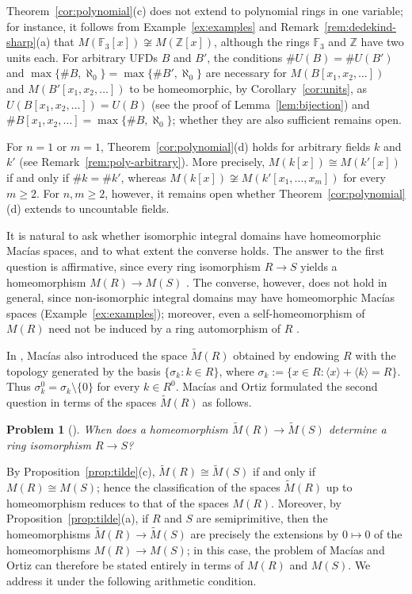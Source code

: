 \documentclass[12pt,reqno,a4paper]{amsart}
\newcommand{\Z}{\mathbb{Z}}
\newcommand{\F}{\mathbb{F}}
\theoremstyle{plain}
\newtheorem*{macproblem}{Problem}
\theoremstyle{definition}
\begin{document}
Theorem~\ref{cor:polynomial}(c) does not extend to polynomial rings in one variable; for instance, it follows from Example~\ref{ex:examples} and Remark~\ref{rem:dedekind-sharp}(a) that $M(\F_3[x])\not\cong M(\Z[x])$, although the rings $\F_3$ and $\Z$ have two units each. For arbitrary UFDs $B$ and $B'$, the conditions $\#U(B)=\#U(B')$ and $\max\{\#B,\aleph_0\}=\max\{\#B',\aleph_0\}$ are necessary for $M(B[x_1,x_2,\dots])$ and $M(B'[x_1,x_2,\dots])$ to be homeomorphic, by Corollary~\ref{cor:units}, as $U(B[x_1,x_2,\dots])=U(B)$ (see the proof of Lemma~\ref{lem:bijection}) and $\#B[x_1,x_2,\dots]=\max\{\#B,\aleph_0\}$; whether they are also sufficient remains open.

For $n=1$ or $m=1$, Theorem~\ref{cor:polynomial}(d) holds for arbitrary fields $k$ and $k'$ (see Remark~\ref{rem:poly-arbitrary}). More precisely, $M(k[x])\cong M(k'[x])$ if and only if $\#k=\#k'$, whereas $M(k[x])\not\cong M(k'[x_1,\dots,x_m])$ for every $m\geq2$. For $n,m\geq2$, however, it remains open whether Theorem~\ref{cor:polynomial}(d) extends to uncountable fields.

It is natural to ask whether isomorphic integral domains have homeomorphic Mac\'ias spaces, and to what extent the converse holds. The answer to the first question is affirmative, since every ring isomorphism $R\to S$ yields a homeomorphism $M(R)\to M(S)$ \cite[Theorem~5.2]{MaciasOrtiz}. The converse, however, does not hold in general, since non-isomorphic integral domains may have homeomorphic Mac\'ias spaces (Example~\ref{ex:examples}); moreover, even a self-homeomorphism of $M(R)$ need not be induced by a ring automorphism of $R$ \cite[Example~5.4]{MaciasOrtiz}. 

In \cite[Theorem~2.1]{MaciasDomains}, Mac\'ias also introduced the space $\widetilde{M}(R)$ obtained by endowing $R$ with the topology generated by the basis $\{\sigma_k : k \in R\}$, where $\sigma_k := \{x \in R : \langle x \rangle + \langle k \rangle = R\}$. Thus $\sigma_k^0=\sigma_k\setminus\{0\}$ for every $k\in R^0$. Mac\'ias and Ortiz formulated the second question in terms of the spaces $\widetilde{M}(R)$ as follows.
\begin{macproblem}[{\cite[Problem~5.6]{MaciasOrtiz}}]
When does a homeomorphism $\widetilde{M}(R)\to\widetilde{M}(S)$ determine a ring isomorphism $R\to S$?
\end{macproblem}
By Proposition~\ref{prop:tilde}(c), $\widetilde{M}(R)\cong\widetilde{M}(S)$ if and only if $M(R)\cong M(S)$; hence the classification of the spaces $\widetilde{M}(R)$ up to homeomorphism reduces to that of the spaces $M(R)$. Moreover, by Proposition~\ref{prop:tilde}(a), if $R$ and $S$ are semiprimitive, then the homeomorphisms $\widetilde{M}(R)\to\widetilde{M}(S)$ are precisely the extensions by $0\mapsto0$ of the homeomorphisms $M(R)\to M(S)$; in this case, the problem of Mac\'ias and Ortiz can therefore be stated entirely in terms of $M(R)$ and $M(S)$. We address it under the following arithmetic condition.
\end{document}
